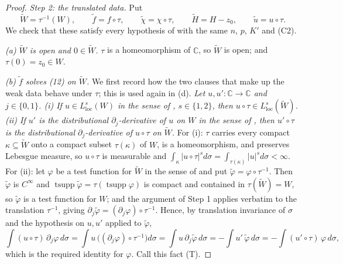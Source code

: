 \begin{proof}
\emph{Step 2: the translated data.}  Put
\[
  \widetilde W=\tau^{-1}(W),\qquad \tilde f=f\circ\tau,\qquad
  \tilde\chi=\chi\circ\tau,\qquad \widetilde H=H-z_0,\qquad
  \tilde u=u\circ\tau .
\]
We check that these satisfy every hypothesis of  with the same
$n$, $p$, $K'$ and (C2).

\emph{(a) $\widetilde W$ is open and $0\in\widetilde W$.}  $\tau$ is a
homeomorphism of $\mathbb{C}$, so $\widetilde W$ is open; and
$\tau(0)=z_0\in W$.

\emph{(b) $\tilde f$ solves (12) on $\widetilde W$.}  We first record how the
two clauses that make up the weak data behave under $\tau$; this is used again
in (d).  \emph{Let $u,u'\colon\mathbb{C}\to\mathbb{C}$ and $j\in\{0,1\}$.
(i) If $u\in L^{s}_{\mathrm{loc}}(W)$ in the sense of ,
$s\in\{1,2\}$, then $u\circ\tau\in L^{s}_{\mathrm{loc}}(\widetilde W)$.
(ii) If $u'$ is the distributional $\partial_j$-derivative of $u$ on $W$ in the
sense of , then $u'\circ\tau$ is the distributional
$\partial_j$-derivative of $u\circ\tau$ on $\widetilde W$.}  For (i): $\tau$
carries every compact $\kappa\subseteq\widetilde W$ onto a compact subset
$\tau(\kappa)$ of $W$, is a homeomorphism, and preserves Lebesgue measure, so
$u\circ\tau$ is measurable and
$\int_\kappa|u\circ\tau|^{s}d\sigma=\int_{\tau(\kappa)}|u|^{s}d\sigma<\infty$.
For (ii): let $\varphi$ be a test function for $\widetilde W$ in the sense of
 and put $\tilde\varphi=\varphi\circ\tau^{-1}$.  Then
$\tilde\varphi$ is $C^\infty$ and
$\operatorname{tsupp}\tilde\varphi=\tau(\operatorname{tsupp}\varphi)$ is
compact and contained in $\tau(\widetilde W)=W$, so $\tilde\varphi$ is a test
function for $W$; and the argument of Step 1 applies verbatim to the
translation $\tau^{-1}$, giving
$\partial_j\tilde\varphi=(\partial_j\varphi)\circ\tau^{-1}$.  Hence, by
translation invariance of $\sigma$ and the hypothesis on $u,u'$ applied to
$\tilde\varphi$,
\[
  \int (u\circ\tau)\,\partial_j\varphi\,d\sigma
  =\int u\,\bigl((\partial_j\varphi)\circ\tau^{-1}\bigr)d\sigma
  =\int u\,\partial_j\tilde\varphi\,d\sigma
  =-\int u'\,\tilde\varphi\,d\sigma
  =-\int (u'\circ\tau)\,\varphi\,d\sigma ,
\]
which is the required identity for $\varphi$.  Call this fact (T).


\end{proof}
